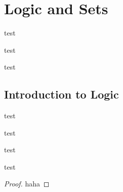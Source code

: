 \chapter{Logic and Sets}

\begin{remark}
    test
\end{remark}
\begin{definition}
    test
\end{definition}
\begin{example}
    test
\end{example}
\section{Introduction to Logic}

\begin{remark}
    test
\end{remark}
\begin{definition}
    test
\end{definition}
\begin{example}
    test
\end{example}
\begin{theorem}
    test
\end{theorem}
\begin{proof}
    haha
\end{proof}